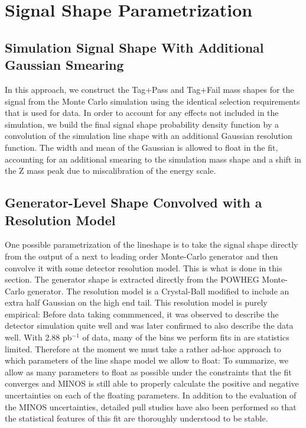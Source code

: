 \section{Signal Shape Parametrization}

\subsection{Simulation Signal Shape With Additional Gaussian Smearing}
\label{sec:MCShape}
In this approach, we construct the Tag+Pass and Tag+Fail mass shapes for the signal from the Monte Carlo simulation using the identical selection requirements that is used for data. In order to account for any effects not included in the simulation, we build the final signal shape probability density function by a convolution of the simulation line shape with an additional Gaussian resolution function. The width and mean of the Gaussian is allowed to float in the fit, accounting for an additional smearing to the simulation mass shape and a shift in the Z mass peak due to miscalibration of the energy scale. 


\subsection{Generator-Level Shape Convolved with a Resolution Model}
\label{sec:genShape}
One possible parametrization of the lineshape is to take the signal shape directly from the output of a next to leading order Monte-Carlo generator and then convolve 
it with some detector resolution model.  This is what is done in this section.  The generator shape is extracted directly from the POWHEG
\cite{Powheg} Monte-Carlo generator.  The resolution model is a Crystal-Ball modified to include an extra half Gaussian on the high end tail.
This resolution model is purely empirical:  Before data taking commmenced, it was observed to describe the detector simulation quite well
and was later confirmed to also describe the data well.  With 2.88 pb$^{-1}$ of data, many of the bins we perform fits in are statistics limited.  
Therefore at the moment we must take a rather ad-hoc approach to which parameters of the line shape model we allow to float:  To summarize, we allow as
many parameters to float as possible under the constraints that the fit converges and MINOS \cite{MINOS} is still able to properly calculate the positive and negative
uncertainties on each of the floating parameters.  %
In addition to the evaluation of the MINOS uncertainties, detailed pull studies have also been performed so that the
statistical features of this fit are thoroughly understood to be stable.


